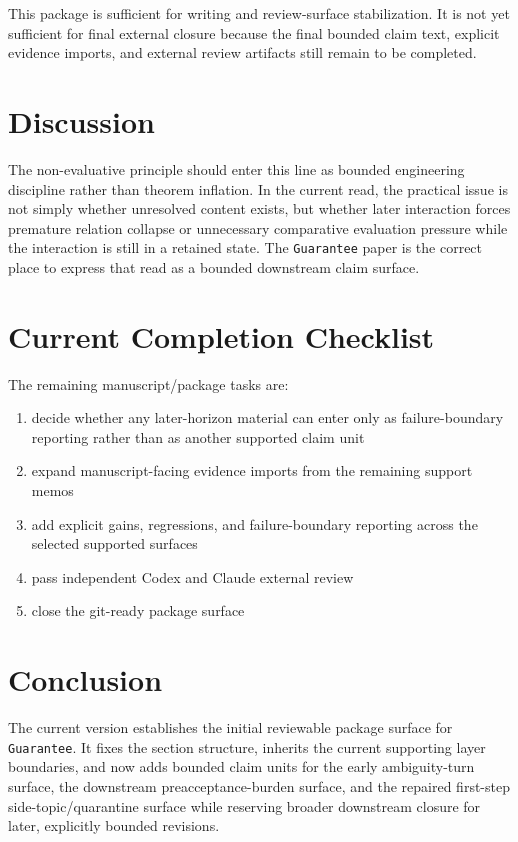 \documentclass[11pt]{article}
\begin{document}
This package is sufficient for writing and review-surface stabilization. It is not
yet sufficient for final external closure because the final bounded claim text,
explicit evidence imports, and external review artifacts still remain to be
completed.

\section{Discussion}

The non-evaluative principle should enter this line as bounded engineering
discipline rather than theorem inflation. In the current read, the practical issue
is not simply whether unresolved content exists, but whether later interaction
forces premature relation collapse or unnecessary comparative evaluation pressure
while the interaction is still in a retained state. The \texttt{Guarantee} paper is
the correct place to express that read as a bounded downstream claim surface.

\section{Current Completion Checklist}

The remaining manuscript/package tasks are:
\begin{enumerate}
\item decide whether any later-horizon material can enter only as failure-boundary
reporting rather than as another supported claim unit
\item expand manuscript-facing evidence imports from the remaining support memos
\item add explicit gains, regressions, and failure-boundary reporting across the
selected supported surfaces
\item pass independent Codex and Claude external review
\item close the git-ready package surface
\end{enumerate}

\section{Conclusion}

The current version establishes the initial reviewable package surface for
\texttt{Guarantee}. It fixes the section structure, inherits the current supporting
layer boundaries, and now adds bounded claim units for the early ambiguity-turn
surface, the downstream preacceptance-burden surface, and the repaired
first-step side-topic/quarantine surface while reserving broader downstream
closure for later, explicitly bounded revisions.
\end{document}
